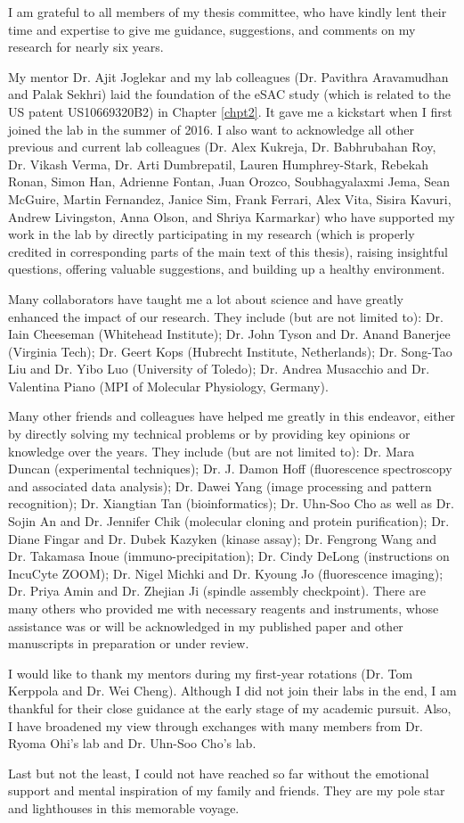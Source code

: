 I am grateful to all members of my thesis committee, who have kindly lent their time and expertise to give me guidance, suggestions, and comments on my research for nearly six years.

My mentor Dr. Ajit Joglekar and my lab colleagues (Dr. Pavithra Aravamudhan and Palak Sekhri) laid the foundation of the eSAC study (which is related to the US patent US10669320B2) in Chapter \ref{chpt2}. It gave me a kickstart when I first joined the lab in the summer of 2016. I also want to acknowledge all other previous and current lab colleagues (Dr. Alex Kukreja, Dr. Babhrubahan Roy, Dr. Vikash Verma, Dr. Arti Dumbrepatil, Lauren Humphrey-Stark, Rebekah Ronan, Simon Han,  Adrienne Fontan, Juan Orozco, Soubhagyalaxmi Jema, Sean McGuire, Martin Fernandez, Janice Sim, Frank Ferrari, Alex Vita, Sisira Kavuri, Andrew Livingston, Anna Olson, and Shriya Karmarkar) who have supported my work in the lab by directly participating in my research (which is properly credited in corresponding parts of the main text of this thesis), raising insightful questions, offering valuable suggestions, and building up a healthy environment.

Many collaborators have taught me a lot about science and have greatly enhanced the impact of our research. They include (but are not limited to): Dr. Iain Cheeseman (Whitehead Institute); Dr. John Tyson and Dr. Anand Banerjee (Virginia Tech); Dr. Geert Kops (Hubrecht Institute, Netherlands); Dr. Song-Tao Liu and Dr. Yibo Luo (University of Toledo); Dr. Andrea Musacchio and Dr. Valentina Piano (MPI of Molecular Physiology, Germany).

Many other friends and colleagues have helped me greatly in this endeavor, either by directly solving my technical problems or by providing key opinions or knowledge over the years. They include (but are not limited to): Dr. Mara Duncan (experimental techniques); Dr. J. Damon Hoff (fluorescence spectroscopy and associated data analysis); Dr. Dawei Yang (image processing and pattern recognition); Dr. Xiangtian Tan (bioinformatics); Dr. Uhn-Soo Cho as well as Dr. Sojin An and Dr. Jennifer Chik (molecular cloning and protein purification); Dr. Diane Fingar and Dr. Dubek Kazyken (kinase assay); Dr. Fengrong Wang and Dr. Takamasa Inoue (immuno-precipitation); Dr. Cindy DeLong (instructions on IncuCyte ZOOM); Dr. Nigel Michki and Dr. Kyoung Jo (fluorescence imaging); Dr. Priya Amin and Dr. Zhejian Ji (spindle assembly checkpoint). There are many others who provided me with necessary reagents and instruments, whose assistance was or will be acknowledged in my published paper \cite{eSAC} and other manuscripts in preparation or under review.

I would like to thank my mentors during my first-year rotations (Dr. Tom Kerppola and Dr. Wei Cheng). Although I did not join their labs in the end, I am thankful for their close guidance at the early stage of my academic pursuit. Also, I have broadened my view through exchanges with many members from Dr. Ryoma Ohi's lab and Dr. Uhn-Soo Cho's lab.

Last but not the least, I could not have reached so far without the emotional support and mental inspiration of my family and friends. They are my pole star and lighthouses in this memorable voyage.